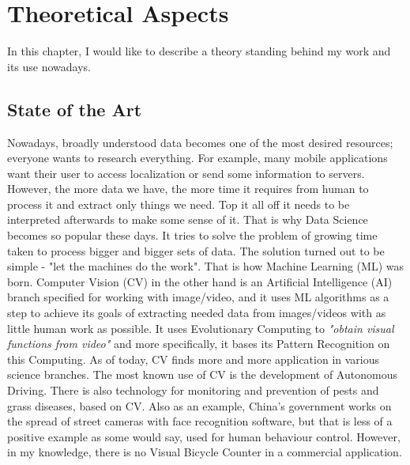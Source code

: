 \chapter{Theoretical Aspects}
\label{cha:theorethicalAspects}

In this chapter, I would like to describe a theory standing behind my work and its use nowadays.


\section{State of the Art}
\label{sec:stateOfTheArt}

Nowadays, broadly understood data becomes one of the most desired resources; everyone wants to research everything. For example, many mobile applications want their user to access localization or send some information to servers. However, the more data we have, the more time it requires from human to process it and extract only things we need. Top it all off it needs to be interpreted afterwards to make some sense of it. That is why Data Science becomes so popular these days. It tries to solve the problem of growing time taken to process bigger and bigger sets of data. The solution turned out to be simple - "let the machines do the work". That is how Machine Learning (ML) was born. Computer Vision\cite{cv} (CV) in the other hand is an Artificial Intelligence (AI) branch specified for working with image/video, and it uses ML algorithms as a step to achieve its goals of extracting needed data from images/videos with as little human work as possible. It uses Evolutionary Computing\cite{cv} to \textit{"obtain visual functions from video"}\cite{cv} and more specifically, it bases its Pattern Recognition\cite{cv} on this Computing. As of today, CV finds more and more application in various science branches. The most known use of CV is the development of Autonomous Driving. There is also technology for monitoring and prevention of pests and grass diseases\cite{appResearch}, based on CV. Also as an example, China's government works on the spread of street cameras with face recognition software, but that is less of a positive example as some would say, used for human behaviour control. However, in my knowledge, there is no Visual Bicycle Counter in a commercial application.



